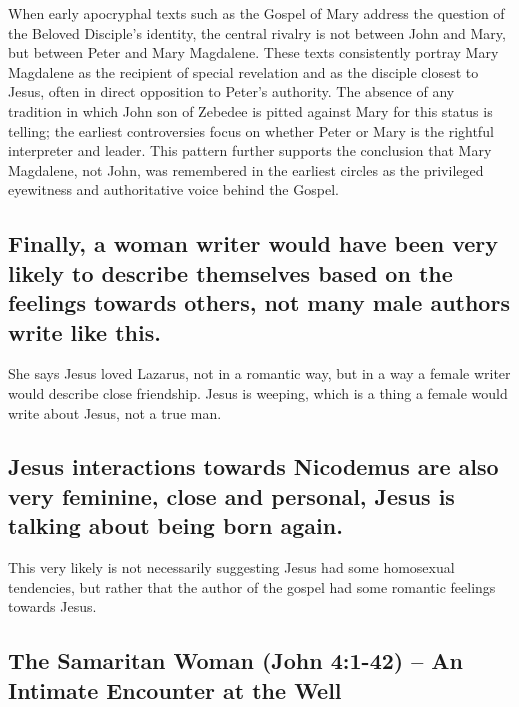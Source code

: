 When early apocryphal texts such as the Gospel of Mary address the question of the Beloved Disciple’s identity, the central rivalry is not between John and Mary, but between Peter and Mary Magdalene. These texts consistently portray Mary Magdalene as the recipient of special revelation and as the disciple closest to Jesus, often in direct opposition to Peter’s authority. The absence of any tradition in which John son of Zebedee is pitted against Mary for this status is telling; the earliest controversies focus on whether Peter or Mary is the rightful interpreter and leader. This pattern further supports the conclusion that Mary Magdalene, not John, was remembered in the earliest circles as the privileged eyewitness and authoritative voice behind the Gospel.

\subsection{Finally, a woman writer would have been very likely to describe themselves based on the feelings towards others, not many male authors write like this.}\label{subsec:finally-a-woman-writer-would-have-been-very-likely-to-describe-themselves-based-on-the-feelings-towards-others-not-many-male-authors-write-like-this.}

She says Jesus loved Lazarus, not in a romantic way, but in a way a female writer would describe close friendship.
Jesus is weeping, which is a thing a female would write about Jesus, not a true man.

\subsection{Jesus interactions towards Nicodemus are also very feminine, close and personal, Jesus is talking about being born again.}\label{subsec:jesus-interactions-towards-nicodemus-are-also-very-feminine-close-and-personal-jesus-is-talking-about-being-born-again.}

This very likely is not necessarily suggesting Jesus had some homosexual tendencies, but rather that the author of the gospel had some romantic feelings towards Jesus.

\subsection{The Samaritan Woman (John 4:1-42) -- An Intimate Encounter at the Well}\label{subsec:the-samaritan-woman-john-41-42-an-intimate-encounter-at-the-well}

